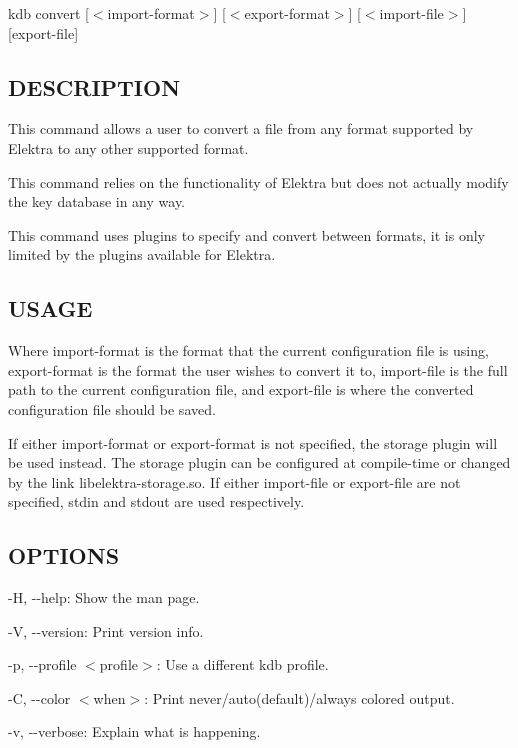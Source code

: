 {\ttfamily kdb convert \mbox{[}$<$import-\/format$>$\mbox{]} \mbox{[}$<$export-\/format$>$\mbox{]} \mbox{[}$<$import-\/file$>$\mbox{]} \mbox{[}export-\/file\mbox{]}}

\subsection*{D\+E\+S\+C\+R\+I\+P\+T\+I\+ON}

This command allows a user to convert a file from any format supported by Elektra to any other supported format.

This command relies on the functionality of Elektra but does not actually modify the key database in any way.

This command uses plugins to specify and convert between formats, it is only limited by the plugins available for Elektra.

\subsection*{U\+S\+A\+GE}

Where {\ttfamily import-\/format} is the format that the current configuration file is using, {\ttfamily export-\/format} is the format the user wishes to convert it to, {\ttfamily import-\/file} is the full path to the current configuration file, and {\ttfamily export-\/file} is where the converted configuration file should be saved.

If either {\ttfamily import-\/format} or {\ttfamily export-\/format} is not specified, the {\ttfamily storage} plugin will be used instead. The {\ttfamily storage} plugin can be configured at compile-\/time or changed by the link {\ttfamily libelektra-\/storage.\+so}. If either {\ttfamily import-\/file} or {\ttfamily export-\/file} are not specified, {\ttfamily stdin} and {\ttfamily stdout} are used respectively.

\subsection*{O\+P\+T\+I\+O\+NS}


\begin{DoxyItemize}
\item {\ttfamily -\/H}, {\ttfamily -\/-\/help}\+: Show the man page.
\item {\ttfamily -\/V}, {\ttfamily -\/-\/version}\+: Print version info.
\item {\ttfamily -\/p}, {\ttfamily -\/-\/profile $<$profile$>$}\+: Use a different kdb profile.
\item {\ttfamily -\/C}, {\ttfamily -\/-\/color $<$when$>$}\+: Print never/auto(default)/always colored output.
\item {\ttfamily -\/v}, {\ttfamily -\/-\/verbose}\+: Explain what is happening.
\end{DoxyItemize}

